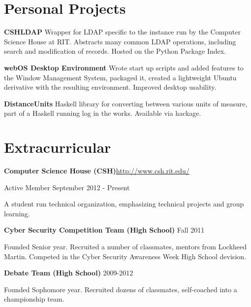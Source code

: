 \documentclass[letter,margin,line]{resume}
\newcommand{\rurl}[1]{\hfill {\footnotesize \url{#1}}}
\begin{document}
\begin{resume}
\section{\mysidestyle Personal Projects}
	\begin{asparablank}
        \item {\bf CSHLDAP}
        \small Wrapper for LDAP specific to the instance run by the Computer Science House at RIT. Abstracts many common LDAP operations, including search and modification of records. Hosted on the Python Package Index.
        \normalsize
        \\
		\item {\bf webOS Desktop Environment}
		\small Wrote start up scripts and added features to the Window Management System, packaged it, created a lightweight Ubuntu derivative with the resulting environment. Improved desktop usability.  
		\normalsize
		\\
		
		\item {\bf DistanceUnits}
		\small Haskell library for converting between various units of measure, part of a Haskell running log in the works. Available via hackage.
		\normalsize
		\\
	\end{asparablank}

\section{\mysidestyle Extracurricular}
	\begin{asparablank}
		\item {\bf Computer Science House ({\small CSH})}\rurl{http://www.csh.rit.edu/}
		\small	\item Active Member \hfill September 2012 - Present
				\item A student run technical organization, emphasizing technical projects and group learning. 
		\\
		\item {\bf Cyber Security Competition Team ({\small High School})} \hfill Fall 2011
		\small \item Founded Senior year. Recruited a number of classmates, mentors from Lockheed Martin. Competed in the Cyber Security Awareness Week High School devision. 
		\\
		\item {\bf Debate Team ({\small High School})} \hfill 2009-2012
		\small \item Founded Sophomore year. Recruited dozens of classmates, self-coached into a championship team.
	\end{asparablank}

\end{resume}
\end{document}
